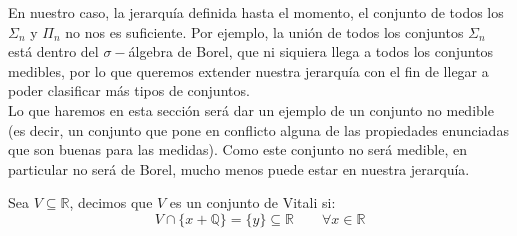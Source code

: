 \noindent
En nuestro caso, la jerarquía definida hasta el momento, el conjunto de todos los $\Sigma_n$ y $\Pi_n$ no nos es suficiente. Por ejemplo, la unión de todos los conjuntos $\Sigma_n$ está dentro del $\sigma-$álgebra de Borel, que ni siquiera llega a todos los conjuntos medibles, por lo que queremos extender nuestra jerarquía con el fin de llegar a poder clasificar más tipos de conjuntos.\\

Lo que haremos en esta sección será dar un ejemplo de un conjunto no medible (es decir, un conjunto que pone en conflicto alguna de las propiedades enunciadas que son buenas para las medidas). Como este conjunto no será medible, en particular no será de Borel, mucho menos puede estar en nuestra jerarquía.

\begin{definicion}
    Sea $V\subseteq \mathbb{R}$, decimos que $V$ es un conjunto de Vitali si:
    \begin{equation*}
        V \cap \{x+\mathbb{Q}\} = \{y\} \subseteq \mathbb{R}  \qquad \forall x\in \mathbb{R}
    \end{equation*}
\end{definicion}

